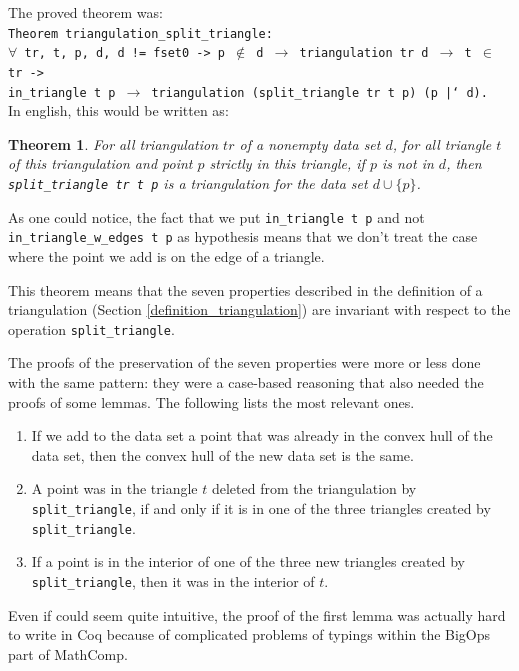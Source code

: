 \documentclass[a4paper,10pt]{article}
\newtheorem{theorem}{Theorem}
\begin{document}
 The proved theorem was:\\
{\tt Theorem triangulation\_split\_triangle:\\
  $\forall$ tr, t, p, d, d != fset0 -> p $\notin$ d $\rightarrow$
                        triangulation tr d $\rightarrow$ t $\in$ tr ->\\
                        in\_triangle t p $\rightarrow$
                        triangulation (split\_triangle tr t p) (p |` d).\\
                       }
In english, this would be written as:
\begin{theorem}
  For all triangulation $tr$ of a nonempty data set $d$,
  for all triangle $t$ of this triangulation and point $p$ strictly in this triangle,
  if $p$ is not in $d$, then
  {\tt split\_triangle tr t p} is a triangulation for the data set $d \cup \{p\}$.
\end{theorem}

As one could notice, the fact that we put {\tt in\_triangle t p} and not {\tt in\_triangle\_w\_edges t p} as hypothesis means that we don't treat the case where the point we add is on the edge of a triangle.

This theorem means that the seven properties described in the definition of a triangulation (Section \ref{definition_triangulation}) are invariant with respect to the operation {\tt split\_triangle}.

The proofs of the preservation of the seven properties were more or less done with the same pattern: they were a case-based reasoning that also needed the proofs of some lemmas. The following lists the most relevant ones.
\begin{enumerate}
\item If we add to the data set a point that was already in the convex hull of the data set, then the convex hull of the new data set is the same.
\item A point was in the triangle $t$ deleted from the triangulation by {\tt split\_triangle}, if and only if it is in one of the three triangles created by {\tt split\_triangle}.
\item If a point is in the interior of one of the three new triangles created by {\tt split\_triangle}, then it was in the interior of $t$.
\end{enumerate}

Even if could seem quite intuitive, the proof of the first lemma was actually hard to write in {\sc Coq} because of complicated problems of typings within the BigOps part of {\sc MathComp}.
\end{document}
